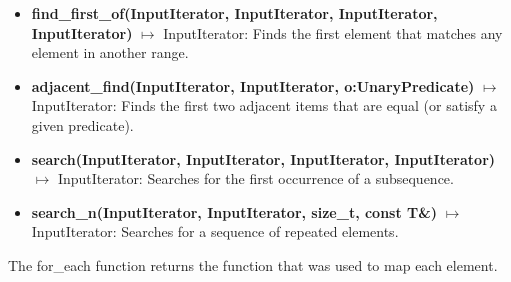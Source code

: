 \documentclass{report}
\begin{document}
\begin{itemize}
        \item \textbf{find\_first\_of(InputIterator, InputIterator, InputIterator, InputIterator)} \(\mapsto\) InputIterator: Finds the first element that matches any element in another range.
        \item \textbf{adjacent\_find(InputIterator, InputIterator, o:UnaryPredicate)} \(\mapsto\) InputIterator: Finds the first two adjacent items that are equal (or satisfy a given predicate).
        \item \textbf{search(InputIterator, InputIterator, InputIterator, InputIterator)} \(\mapsto\) InputIterator: Searches for the first occurrence of a subsequence.
        \item \textbf{search\_n(InputIterator, InputIterator, size\_t, const T\&)} \(\mapsto\) InputIterator: Searches for a sequence of repeated elements.
    \end{itemize}
    \bigbreak \noindent 
    \begin{notebox}
       The for\_each function returns the function that was used to map each element.
    \end{notebox}
\end{document}
